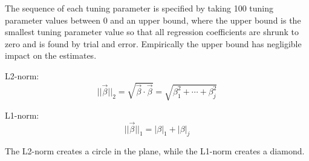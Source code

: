 The sequence of each tuning parameter is specified by taking 100 tuning parameter values between 0 and an upper bound, where the upper bound is the smallest tuning parameter value so that all regression coefficients are shrunk to zero and is found by trial and error. Empirically the upper bound has negligible impact on the estimates.

L2-norm:
\begin{equation}
|| \vec{\beta} ||_2 = \sqrt{\vec{\beta} \cdot \vec{\beta}} = \sqrt{\beta_1^2 + \cdots + \beta_j^2}
\end{equation}

L1-norm:
\begin{equation}
|| \vec{\beta} ||_1 = |\beta|_1 + |\beta|_j
\end{equation}

The L2-norm creates a circle in the plane, while the L1-norm creates a diamond.